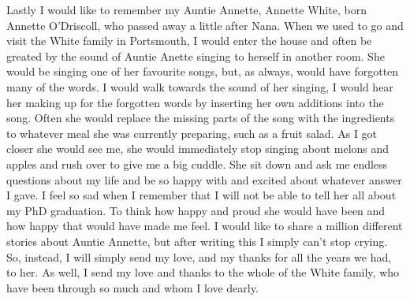 Lastly I would like to remember my Auntie Annette, Annette White, born Annette O'Driscoll, who passed away a little after Nana. When we used to go and visit the White family in Portsmouth, I would enter the house and often be greated by the sound of Auntie Anette singing to herself in another room. She would be singing one of her favourite songs, but, as always, would have forgotten many of the words. I would walk towards the sound of her singing, I would hear her making up for the forgotten words by inserting her own additions into the song. Often she would replace the missing parts of the song with the ingredients to whatever meal she was currently preparing, such as a fruit salad. As I got closer she would see me, she would immediately stop singing about melons and apples and rush over to give me a big cuddle. She sit down and ask me endless questions about my life and be so happy with and excited about whatever answer I gave. I feel so sad when I remember that I will not be able to tell her all about my PhD graduation. To think how happy and proud she would have been and how happy that would have made me feel. I would like to share a million different stories about Auntie Annette, but after writing this I simply can't stop crying. So, instead, I will simply send my love, and my thanks for all the years we had, to her. As well, I send my love and thanks to the whole of the White family, who have been through so much and whom I love dearly.

